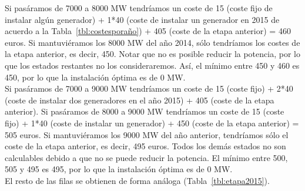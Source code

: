 \documentclass[12pt,a4paper,twoside,openright,titlepage,final]{article}
\begin{document}
Si pasáramos de 7000 a 8000 MW tendríamos un coste de 15 (coste fijo de instalar algún generador) + 1*40 (coste de instalar un generador en 2015 de acuerdo a la Tabla~\ref{tbl:costesporaño}) + 405 (coste de la etapa anterior) = 460 euros. Si mantuviéramos los 8000 MW del año 2014, sólo tendríamos los costes de la etapa anterior, es decir, 450. Notar que no es posible reducir la potencia, por lo que los estados restantes no los consideraremos. Así, el mínimo entre 450 y 460 es 450, por lo que la instalación óptima es de 0 MW.\\

Si pasáramos de 7000 a 9000 MW tendríamos un coste de 15 (coste fijo) + 2*40 (coste de instalar dos generadores en el año 2015) + 405 (coste de la etapa anterior). Si pasáramos de 8000 a 9000 MW tendríamos un coste de 15 (coste fijo) + 1*40 (coste de instalar un generador) + 450 (coste de la etapa anterior) = 505 euros. Si mantuviéramos los 9000 MW del año anterior, tendríamos sólo el coste de la etapa anterior, es decir, 495 euros. Todos los demás estados no son calculables debido a que no se puede reducir la potencia. El mínimo entre 500, 505 y 495 es 495, por lo que la instalación óptima es de 0 MW.\\

El resto de las filas se obtienen de forma análoga (Tabla~\ref{tbl:etapa2015}).\\
\end{document}
